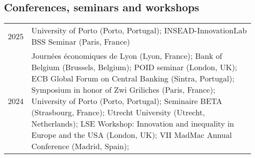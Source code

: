 \documentclass[12pt]{article}
\begin{document}
\subsection*{Conferences, seminars and workshops}
\begin{footnotesize}
\begin{tabular}{p{1cm}p{13cm}}
2025 & University of Porto (Porto, Portugal); INSEAD-InnovationLab BSS Seminar (Paris, France) \\

2024 & Journées économiques de Lyon (Lyon, France); Bank of Belgium (Brussels, Belgium); POID seminar (London, UK); ECB Global Forum on Central Banking (Sintra, Portugal); Symposium in honor of Zwi Griliches (Paris, France);  University of Porto (Porto, Portugal); Seminaire BETA (Strasbourg, France); Utrecht University (Utrecht, Netherlands); LSE Workshop: Innovation and inequality in Europe and the USA (London, UK); VII MadMac Annual Conference (Madrid, Spain); \\


\end{tabular}
\end{footnotesize}
\end{document}
